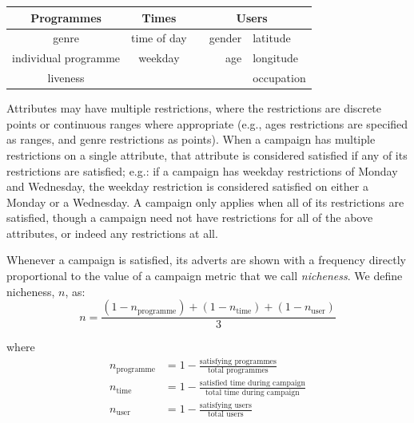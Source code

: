 	\begin{center}
		\begin{tabular}{c c r l}
			\toprule
			\textbf{Programmes} & \textbf{Times} & \multicolumn{2}{c}{\textbf{Users}} \\
			\midrule
			genre & time of day & ~~gender & latitude \\ %
			individual programme & weekday & age & longitude \\
			liveness & & &  occupation \\
			\bottomrule
		\end{tabular}
	\end{center}

	Attributes may have multiple restrictions, where the restrictions are discrete points or continuous ranges where appropriate (e.g., ages restrictions are specified as ranges, and genre restrictions as points). When a campaign has multiple restrictions on a single attribute, that attribute is considered satisfied if any of its restrictions are satisfied; e.g.: if a campaign has weekday restrictions of Monday and Wednesday, the weekday restriction is considered satisfied on either a Monday or a Wednesday. A campaign only applies when all of its restrictions are satisfied, though a campaign need not have restrictions for all of the above attributes, or indeed any restrictions at all.

	Whenever a campaign is satisfied, its adverts are shown with a frequency directly proportional to the value of a campaign metric that we call \textit{nicheness}. We define nicheness, $n$, as:
	$$
		n = \frac{(1-n_\text{programme}) + (1-n_\text{time}) + (1-n_\text{user})}{3}
	$$

	where
	\begin{align*}
		n_\text{programme} &= 1 - \frac{\text{satisfying programmes}}{\text{total programmes}} \\
		n_\text{time} &= 1 - \frac{\text{satisfied time during campaign}}{\text{total time during campaign}} \\
		n_\text{user} &= 1 - \frac{\text{satisfying users}}{\text{total users}}
	\end{align*}

